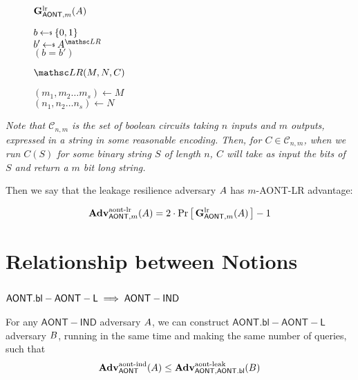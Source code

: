 \documentclass[11pt,twoside]{article}
\begin{document}
\begin{figure}[H]
{
\underline{$\mathbf{G}_{\mathsf{AONT},m}^\text{lr}(A)$}

\begin{algorithm}[H]
$b \getsr \bits$\\
$b' \getsr \advA^{\LRO}$\\
\Return $(b=b')$
\end{algorithm}

\smallskip
\underline{$\LRO(M,N,C)$}

\begin{algorithm}[H]
$(m_1,m_2\dots m_s)\gets M$\\
$(n_1,n_2\dots n_s)\gets N$\\
\end{algorithm}
}
\end{figure}

\emph{Note that $\mathcal{C}_{n,m}$ is the set of boolean circuits taking $n$ inputs and $m$ outputs, expressed in a string in some reasonable encoding. Then, for $C\in \mathcal{C}_{n,m}$, when we run $C(S)$ for some binary string $S$ of length $n$, $C$ will take as input the bits of $S$ and return a $m$ bit long string.}

Then we say that the leakage resilience adversary $A$ has $m$-AONT-LR advantage: 

$$\textbf{Adv}^\text{aont-lr}_{\mathsf{AONT},m}(A)=2\cdot{\Pr\left[\,{\mathbf{G}_{\mathsf{AONT},m}^\text{lr}(A)}\,\right]} - 1$$

\section{Relationship between Notions} 

\subsection{$\mathsf{AONT.bl-AONT-L}\implies\mathsf{AONT-IND}$}

\begin{theorem}
For any $\mathsf{AONT-IND}$ adversary $A$, we can construct $\mathsf{AONT.bl-AONT-L}$ adversary $B$, running in the same time and making the same number of queries, such that $$\textbf{Adv}^\text{aont-ind}_{\mathsf{AONT}}(A)\le\textbf{Adv}^\text{aont-leak}_{\mathsf{AONT},\mathsf{AONT.bl}}(B)$$
\end{theorem}
\end{document}
